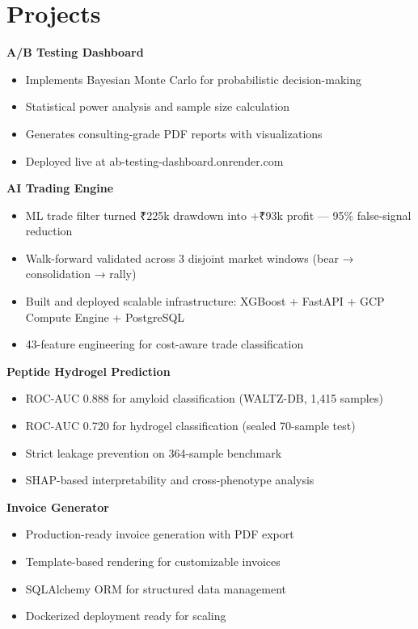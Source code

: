 \documentclass[11pt,a4paper]{article}
\begin{document}
\section*{Projects}
\noindent\textbf{A/B Testing Dashboard} \hfill \href{https://ab-testing-dashboard.onrender.com}{\faGlobe} \href{https://github.com/jiyanshusingh/ab-testing-dashboard}{\faGithub}
\begin{itemize}
    \item Implements Bayesian Monte Carlo for probabilistic decision-making
    \item Statistical power analysis and sample size calculation
    \item Generates consulting-grade PDF reports with visualizations
    \item Deployed live at ab-testing-dashboard.onrender.com
\end{itemize}

\noindent\textbf{AI Trading Engine} \hfill \href{https://github.com/jiyanshusingh/trading-engine}{\faGithub}
\begin{itemize}
    \item ML trade filter turned ₹225k drawdown into +₹93k profit — 95\% false-signal reduction
    \item Walk-forward validated across 3 disjoint market windows (bear → consolidation → rally)
    \item Built and deployed scalable infrastructure: XGBoost + FastAPI + GCP Compute Engine + PostgreSQL
    \item 43-feature engineering for cost-aware trade classification
\end{itemize}

\noindent\textbf{Peptide Hydrogel Prediction} \hfill \href{https://peptide-hydrogel-portal.onrender.com}{\faGlobe} \href{https://github.com/jiyanshusingh/hydrogel_project}{\faGithub}
\begin{itemize}
    \item ROC-AUC 0.888 for amyloid classification (WALTZ-DB, 1,415 samples)
    \item ROC-AUC 0.720 for hydrogel classification (sealed 70-sample test)
    \item Strict leakage prevention on 364-sample benchmark
    \item SHAP-based interpretability and cross-phenotype analysis
\end{itemize}

\noindent\textbf{Invoice Generator} \hfill \href{https://github.com/jiyanshusingh/invoice-generator}{\faGithub}
\begin{itemize}
    \item Production-ready invoice generation with PDF export
    \item Template-based rendering for customizable invoices
    \item SQLAlchemy ORM for structured data management
    \item Dockerized deployment ready for scaling
\end{itemize}
\end{document}
